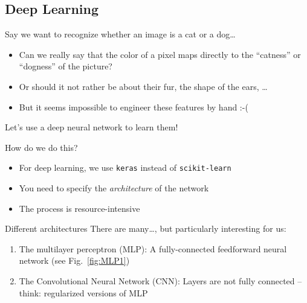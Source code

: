 



\subsection{Deep Learning}


\begin{frame}{Say we want to recognize whether an image is a cat or a dog\ldots}
  \begin{itemize}
  \item Can we really say that the color of a pixel maps directly to the ``catness'' or ``dogness'' of the picture?
  \item Or should it not rather be about their fur, the shape of the ears, \ldots
  \item But it seems impossible to engineer these features by hand :-(
  \end{itemize}

  \pause

  Let's use a deep neural network to learn them!
\end{frame}




\begin{frame}{How do we do this?}
  \begin{itemize}
  \item For deep learning, we use \texttt{keras} instead of \texttt{scikit-learn}
  \item You need to specify the \emph{architecture} of the network
  \item The process is resource-intensive
  \end{itemize}
\end{frame}


\begin{frame}{Different architectures}
  There are many\ldots, but particularly interesting for us:
  \begin{enumerate}
  \item The multilayer perceptron (MLP): A fully-connected feedforward neural network (see Fig.~\ref{fig:MLP1})
  \item The Convolutional Neural Network (CNN): Layers are not fully connected -- think: regularized versions of MLP
  \end{enumerate}



\end{frame}


